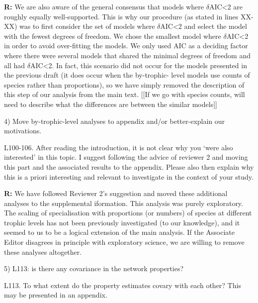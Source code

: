 \documentclass[12pt]{letter}
\newenvironment{refquote}{\bigskip \begin{it}}{\end{it}\smallskip}
\begin{document}
  \textbf{R:} We are also aware of the general consensus    that models where
  $\delta$AIC\textless2 are roughly equally well-supported. This is why our
  procedure (as stated in lines XX-XX) was to first consider the set of models
  where $\delta$AIC\textless2 and select the model with the fewest degrees of
  freedom. We chose the smallest model where $\delta$AIC\textless2 in order to
  avoid over-fitting the models. We only used AIC as a deciding factor where
  there were several models that shared the minimal degrees of freedom and all
  had $\delta$AIC\textless2.  In fact, this scenario did not occur for the
  models presented in the previous draft   (it does occur when the by-trophic-
  level models use counts of species rather than proportions), so we have simply
  removed the description of this step of our analysis from the main text. [[If we go with species counts, will need to describe what the differences are between the similar models]]
  

  4) Move by-trophic-level analyses to appendix and/or better-explain our motivations.


  \begin{refquote}

    L100-106. After reading the introduction, it is not clear why you ‘were
    also interested’ in this topic. I suggest following the advice of reviewer
    2 and moving this part and the associated results to the appendix. Please
    also then explain why this is a priori interesting and relevant to
    investigate in the context of your study.

  \end{refquote}

  \textbf{R:} We have followed Reviewer 2's suggestion and 
  moved these additional analyses to the supplemental 
  iformation. This analysis was purely exploratory. The 
  scaling of specialisation with proportions (or numbers) 
  of species at different trophic levels has not been 
  previously investigated (to our knowledge), and it 
  seemed to us to be a logical extension of the main 
  analysis. If the Associate Editor disagrees in principle 
  with exploratory science, we are willing to remove these 
  analyses altogether.


  5) L113: is there any covariance in the network properties?

  \begin{refquote}

    L113. To what extent do the property estimates covary with each other?
    This may be presented in an appendix.

  \end{refquote}
\end{document}
